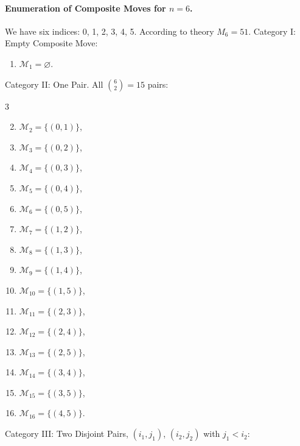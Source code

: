 \documentclass[runningheads]{llncs}
\begin{document}
\paragraph{Enumeration of Composite Moves for $n=6$.} We have six indices: 0, 1, 2, 3, 4, 5. According to theory $M_6 = 51$.
Category I: Empty Composite Move:
\begin{enumerate}
  \item $\mathcal{M}_1 = \varnothing$.
\end{enumerate}
Category II: One Pair. All $\binom{6}{2} = 15$ pairs:
\begin{multicols}{3}
\begin{enumerate}
  \setcounter{enumi}{1}
  \item $\mathcal{M}_2 = \{(0,1)\}$,
  \item $\mathcal{M}_3 = \{(0,2)\}$,
  \item $\mathcal{M}_4 = \{(0,3)\}$,
  \item $\mathcal{M}_5 = \{(0,4)\}$,
  \item $\mathcal{M}_6 = \{(0,5)\}$,
  \item $\mathcal{M}_7 = \{(1,2)\}$,
  \item $\mathcal{M}_8 = \{(1,3)\}$,
  \item $\mathcal{M}_9 = \{(1,4)\}$,
  \item $\mathcal{M}_{10} = \{(1,5)\}$,
  \item $\mathcal{M}_{11} = \{(2,3)\}$,
  \item $\mathcal{M}_{12} = \{(2,4)\}$,
  \item $\mathcal{M}_{13} = \{(2,5)\}$,
  \item $\mathcal{M}_{14} = \{(3,4)\}$,
  \item $\mathcal{M}_{15} = \{(3,5)\}$,
  \item $\mathcal{M}_{16} = \{(4,5)\}$.
\end{enumerate}
\end{multicols}
Category III: Two Disjoint Pairs, $(i_1,j_1)$, $(i_2,j_2)$ with $j_1 < i_2$:
\end{document}
